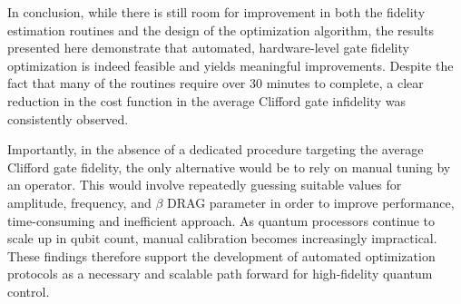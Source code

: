 In conclusion, while there is still room for improvement in both the fidelity estimation routines and the design of the optimization algorithm, the results presented here demonstrate that automated, hardware-level gate fidelity optimization is indeed feasible and yields meaningful improvements. 
Despite the fact that many of the routines require over 30 minutes to complete, a clear reduction in the cost function in the average Clifford gate infidelity was consistently observed.

Importantly, in the absence of a dedicated procedure targeting the average Clifford gate fidelity, the only alternative would be to rely on manual tuning by an operator. 
This would involve repeatedly guessing suitable values for amplitude, frequency, and $\beta$ DRAG parameter in order to improve performance, time-consuming and inefficient approach. 
As quantum processors continue to scale up in qubit count, manual calibration becomes increasingly impractical. 
These findings therefore support the development of automated optimization protocols as a necessary and scalable path forward for high-fidelity quantum control.

